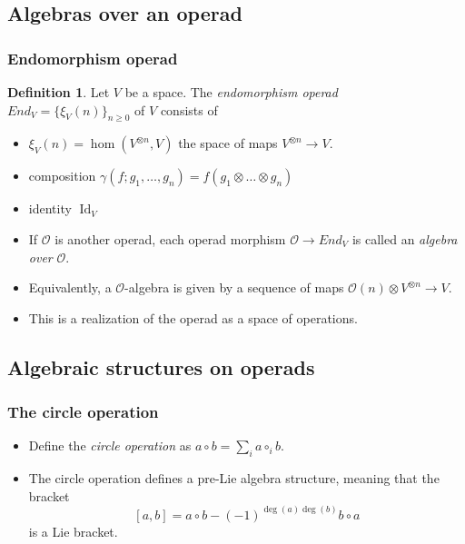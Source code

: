 \documentclass{beamer}
\theoremstyle{definition}
\newtheorem{defi}{Definition}
\begin{document}
\subsection{Algebras over an operad}
\begin{frame}
	\frametitle{Endomorphism operad}
	\begin{defi}
		Let $V$ be a space. The \emph{endomorphism operad} $End_V = \{ \xi_V(n) \}_{n\geq 0}$ of $V$ consists of
		\begin{itemize}
			\item<1-> $\xi_V(n)=\hom(V^{\otimes n},V)
			$ the space of maps $V^{\otimes n} \to V$.
			\item<2-> composition $\gamma(f; g_1, \dots, g_n)= f(g_1\otimes\dots\otimes g_n)$
			\item<3-> identity $\operatorname{Id}_V$
		\end{itemize}
	\end{defi}
\end{frame}
\begin{frame}
\begin{itemize}
\item<1->
If $\mathcal{O}$ is another operad, each operad morphism $\mathcal{O} \to End_V$ is called an \emph{algebra over} $\mathcal{O}$. 
\item<2->Equivalently, a $\mathcal{O}$-algebra is given by a sequence of maps $\mathcal{O}(n)\otimes V^{\otimes n}\to V$.
\item<3-> This is a realization of the operad as a space of operations.
\end{itemize}
\end{frame}

\subsection{Algebraic structures on operads}
\begin{frame}
\frametitle{The circle operation}
\begin{itemize}
\item<1-> Define the \emph{circle operation} as $a\circ b = \sum_i a\circ_i b$. %
\item The circle operation defines a pre-Lie algebra structure, meaning that the bracket
\[[a,b]=a\circ b-(-1)^{\deg(a)\deg(b)}b\circ a\]
is a Lie bracket.
\end{itemize}
\end{frame}
\end{document}
